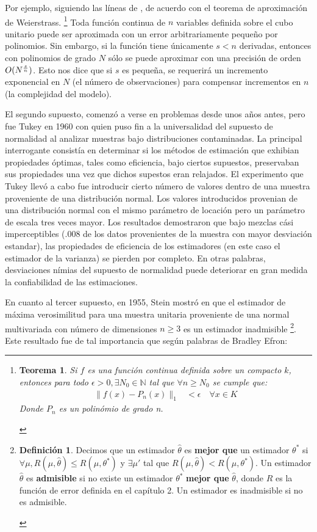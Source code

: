 \documentclass{book}
\theoremstyle{plain}
\newtheorem{thm}{Teorema}[section]
\theoremstyle{definition}
\newtheorem{defn}{Definición}[section]
\theoremstyle{remark}
\begin{document}
Por ejemplo, siguiendo las líneas de \cite{VAPNIK1}, de acuerdo con el teorema de aproximación de Weierstrass. \footnote{\begin{thm}Si $f$ es una función continua definida sobre un compacto $k$, entonces para todo $\epsilon > 0, \exists N_0\in\mathbb{N}$ tal que $\forall n\geq N_0$ se cumple que:
\begin{equation*}
  \begin{split}
    \|f(x) - P_n(x)\|_1 &< \epsilon\quad\forall x\in K
  \end{split}
\end{equation*}
Donde $P_n$ es un polinómio de grado n.
\end{thm}} Toda función continua de $n$ variables definida sobre el cubo unitario puede ser aproximada con un error arbitrariamente pequeño por polinomios. Sin embargo, si la función tiene únicamente $s<n$ derivadas, entonces con polinomios de grado $N$ sólo se puede aproximar con una precisión de orden $\large{O}(N^{\frac{s}{n}})$. Esto nos dice que si $s$ es pequeña, se requerirá un incremento exponencial en $N$ (el número de observaciones) para compensar incrementos en $n$ (la complejidad del modelo).

El segundo supuesto, comenzó a verse en problemas desde unos años antes, pero fue Tukey en 1960 con\cite{TUKEY} quien puso fin a la universalidad del supuesto de normalidad al analizar muestras bajo distribuciones contaminadas. La principal interrogante consistía en determinar si los métodos de estimación que exhibian propiedades óptimas, tales como eficiencia,  bajo ciertos supuestos, preservaban sus propiedades una vez que dichos supestos eran relajados. El experimento que Tukey llevó a cabo fue introducir cierto número de valores dentro de una muestra proveniente de una distribución normal. Los valores introducidos provenian de una distribución normal con el mismo parámetro de locación pero un parámetro de escala tres veces mayor. Los resultados demostraron que bajo mezclas cási imperceptibles (.008 de los datos provenientes de la muestra con mayor desviación estandar), las propiedades de eficiencia de los estimadores (en este caso el estimador de la varianza) se pierden por completo. En otras palabras, desviaciones nímias del supuesto de normalidad puede deteriorar en gran medida la confiabilidad de las estimaciones.

En cuanto al tercer supuesto, en 1955, Stein mostró en \cite{STEIN1} que el estimador de máxima verosimilitud para una muestra unitaria proveniente de una normal multivariada con número de dimensiones $n\geq 3$ es un estimador inadmisible \footnote{\begin{defn}Decimos que un estimador $\hat{\theta}$ es \textbf{mejor que} un estimador $\theta^*$ si $\forall\mu,R(\mu,\hat{\theta})\leq R(\mu,\theta^*)$ y $\exists\mu'$ tal que $R(\mu,\hat{\theta})<R(\mu,\theta^*)$. Un estimador $\hat{\theta}$ es \textbf{admisible} si no existe un estimador $\theta^*$ \textbf{mejor que} $\hat{\theta}$, donde $R$ es la función de error definida en el capítulo 2. Un estimador es inadmisible si no es admisible.\end{defn}}. Este resultado fue de tal importancia que según palabras de Bradley Efron:
\end{document}
